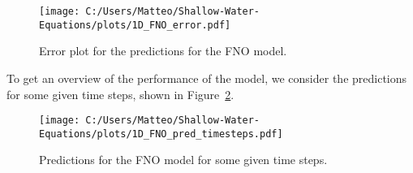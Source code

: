 \begin{figure}[H]
    \centering
    \texttt{[image: C:/Users/Matteo/Shallow-Water-Equations/plots/1D\_FNO\_error.pdf]}
    \caption{Error plot for the predictions for the FNO model.}\label{fig:1D_FNO_error}
\end{figure}

To get an overview of the performance of the model, we consider the predictions for some given time steps, shown in Figure~\ref{fig:1D_FNO_pred_timesteps}.
\begin{figure}[H]
    \centering
    \texttt{[image: C:/Users/Matteo/Shallow-Water-Equations/plots/1D\_FNO\_pred\_timesteps.pdf]}
    \caption{Predictions for the FNO model for some given time steps.}\label{fig:1D_FNO_pred_timesteps}
\end{figure}




